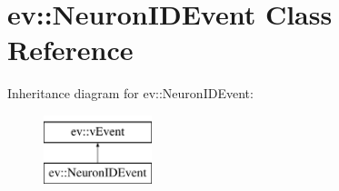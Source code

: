 \hypertarget{classev_1_1NeuronIDEvent}{}\section{ev\+:\+:Neuron\+I\+D\+Event Class Reference}
\label{classev_1_1NeuronIDEvent}
Inheritance diagram for ev\+:\+:Neuron\+I\+D\+Event\+:\begin{figure}[H]
\begin{center}
\leavevmode
\includegraphics[height=2.000000cm]{classev_1_1NeuronIDEvent}
\end{center}
\end{figure}
